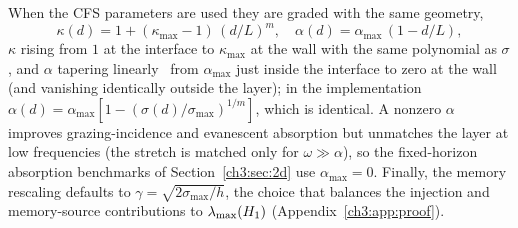 When the CFS parameters are used they are graded with the same
geometry,
\begin{equation}
  \kappa(d) = 1 + (\kappa_{\max}-1)\,(d/L)^{m},
  \quad
  \alpha(d) = \alpha_{\max}\,(1-d/L),
  \label{ch3:appB:eq:grading}
\end{equation}
$\kappa$ rising from $1$ at the interface to $\kappa_{\max}$ at the
wall with the same polynomial as $\sigma$, and $\alpha$ tapering
linearly~\cite{komatitsch2007unsplit} from $\alpha_{\max}$ just inside
the interface to zero at the wall (and vanishing identically outside
the layer); in the implementation
$\alpha(d)=\alpha_{\max}[1-(\sigma(d)/\sigma_{\max})^{1/m}]$, which is
identical.  A nonzero $\alpha$ improves grazing-incidence and
evanescent absorption but unmatches the layer at low frequencies (the
stretch is matched only for $\omega\gg\alpha$), so the fixed-horizon
absorption benchmarks of Section~\ref{ch3:sec:2d} use $\alpha_{\max}=0$.
Finally, the memory rescaling defaults to
$\gamma=\sqrt{2\sigma_{\max}/h}$, the choice that balances the
injection and memory-source contributions to $\lambda_{\max}(H_1)$
(Appendix~\ref{ch3:app:proof}).
